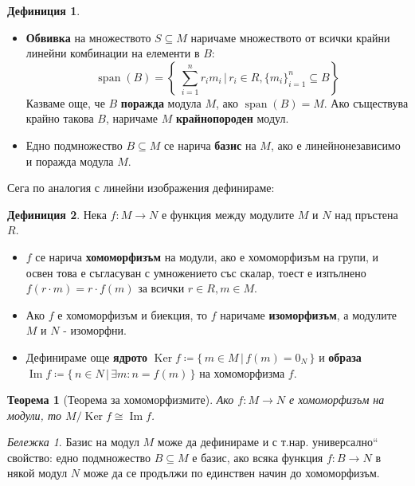 \documentclass{article}
\newif\ifusemulticols
\newcommand\newterm[1]{\textbf{#1}}
\theoremstyle{definition}
\newtheorem{deff}{Дефиниция}
\theoremstyle{remark}
\newtheorem*{note}{Бележка}
\theoremstyle{plain}
\newtheorem{theorem}{Теорема}
\theoremstyle{plain}
\newenvironment{mymulticols}
    { \ifusemulticols \begin{multicols}{2} \fi }
    { \ifusemulticols \end{multicols} \fi }
\DeclareMathOperator{\vecspan}{span}
\DeclareMathOperator{\Ker}{Ker}
\DeclareMathOperator{\image}{Im}
\begin{document}
\begin{mymulticols}
\begin{deff}
\begin{itemize}
        \item \newterm{Обвивка} на множеството $S \subseteq M$ наричаме множеството от всички крайни линейни комбинации на елементи в $B$: $$\vecspan(B)=\left\{\; \sum_{i=1}^n r_i m_i \,\Big|\, r_i \in R, \{m_i\}_{i=1}^n \subseteq B \right\}$$
            Казваме още, че $B$ \newterm{поражда} модула $M$, ако $\vecspan(B) = M$.
            Ако съществува крайно такова $B$, наричаме $M$ \newterm{крайнопороден} модул.
        \item Едно подмножество $B \subseteq M$ се нарича \newterm{базис} на $M$, ако е линейнонезависимо и поражда модула $M$.
    \end{itemize}
\end{deff}

Сега по аналогия с линейни изображения дефинираме:

\begin{deff}
    Нека $f: M \to N$ е функция между модулите $M$ и $N$ над пръстена $R$.
    \begin{itemize}
        \item $f$ се нарича \newterm{хомоморфизъм} на модули, ако е хомоморфизъм на групи, и освен
            това е съгласуван с умножението със скалар, тоест е изпълнено $f(r\cdot m) = r \cdot
            f(m)$ за всички $r \in R, m \in M$.
        \item Ако $f$ е хомоморфизъм и биекция, то $f$ наричаме \newterm{изоморфизъм}, а модулите
            $M$ и $N$ - изоморфни.

        \item Дефинираме още \newterm{ядрото} $\Ker f \coloneqq \{ \, m \in M \,|\, f(m) = 0_N \,
            \}$ и \newterm{образа} $\image f \coloneqq \{ \, n \in N \,|\, \exists m: n = f(m) \,
            \}$ на хомоморфизма $f$.
    \end{itemize}
\end{deff}

\begin{theorem}[Теорема за хомоморфизмите]
    Ако ${f : M \to N}$ е хомоморфизъм на модули, то $M / \Ker f \cong \image f$.
\end{theorem}

\begin{note}
    Базис на модул $M$ може да дефинираме и с т.нар. \quotedblbase универсално`` свойство: едно подмножество $B \subseteq M$ е базис, ако всяка функция $f: B \to N$ в някой модул $N$ може да се продължи по единствен начин до хомоморфизъм.
\end{note}


\end{mymulticols}
\end{document}
